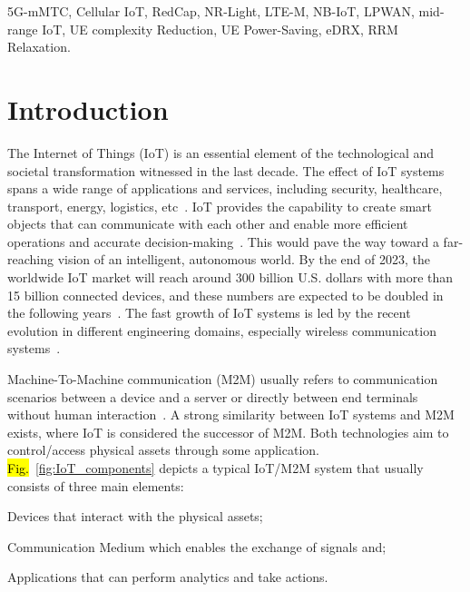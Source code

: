 \documentclass[]{IEEEtran}
\begin{document}
\begin{IEEEkeywords}
5G-mMTC, Cellular IoT, RedCap, NR-Light, LTE-M, NB-IoT, LPWAN, mid-range IoT, UE complexity Reduction, UE Power-Saving, eDRX, RRM Relaxation.
\end{IEEEkeywords}



\section{Introduction}
\label{sec:1-Inro}


The Internet of Things (IoT) is an essential element of the technological and societal transformation witnessed in the last decade.
The effect of IoT systems spans a wide range of applications and services, including security, healthcare, transport, energy, logistics, etc~\cite{andreev2015understanding}.
IoT provides the capability to create smart objects that can communicate with each other and enable more efficient operations and accurate decision-making~\cite{itu-t_overview_2012_Y.2060}.
This would pave the way toward a far-reaching vision of an intelligent, autonomous world.
By the end of 2023, the worldwide IoT market will reach around 300 billion U.S. dollars with more than 15 billion connected devices, and these numbers are expected to be doubled in the following years~\cite{transforma_insights_current_nodate}.
The fast growth of IoT systems is led by the recent evolution in different engineering domains, especially wireless communication systems~\cite{chettri_comprehensive_2020_1}.

Machine-To-Machine communication (M2M) usually refers to communication scenarios between a device and a server or directly between end terminals without human interaction~\cite{herrero_fundamentals_2021}.
A strong similarity between IoT systems and M2M exists, where IoT is considered the successor of M2M.
Both technologies aim to control/access physical assets through some application. \hl{Fig.}~\ref{fig:IoT_components} depicts a typical IoT/M2M system that usually consists of three main elements: \begin{enumerate*}
    \item Devices that interact with the physical assets;
    \item Communication Medium which enables the exchange of signals and;
    \item Applications that can perform analytics and take actions.
\end{enumerate*}
\end{document}
